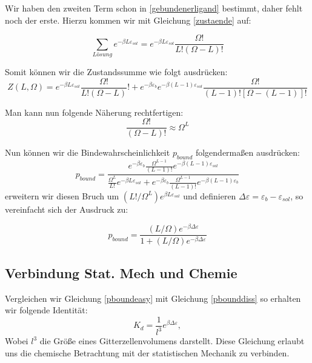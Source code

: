 \documentclass[bachelor,       %
               twoside,        %
               BCOR10mm,       %
               english,ngerman, %
               ]{GAUBM}
\begin{document}
Wir haben den zweiten Term schon in \ref{gebundenerligand} bestimmt, daher fehlt noch der erste.
Hierzu kommen wir mit Gleichung \ref{zustaende} auf:

\begin{equation}
\sum_{Lösung}e^{-\beta L\varepsilon_{sol}} = e^{-\beta L\varepsilon_{sol}}\frac{\Omega!}{L!(\Omega-L)!}
\end{equation}

Somit können wir die Zustandssumme wie folgt ausdrücken:
\begin{equation}
Z(L,\Omega) = e^{-\beta L\varepsilon_{sol}}\frac{\Omega!}{L!(\Omega-L)}! + e^{-\beta\varepsilon_b}e^{-\beta(L-1)\varepsilon_{sol}} \frac{\Omega!}{(L-1)![\Omega-(L-1)]!}
\end{equation}

Man kann nun folgende Näherung rechtfertigen:\cite{phybio}
\begin{equation}
\frac{\Omega!}{(\Omega-L)!} \approx \Omega^L
\end{equation}

Nun können wir die Bindewahrscheinlichkeit $p_{bound}$ folgendermaßen ausdrücken:
\begin{equation}
p_{bound} = \frac{e^{-\beta\varepsilon_b}\frac{\Omega^{L-1}}{(L-1)!}e^{-\beta(L-1)\varepsilon_{sol}}}{\frac{\Omega^L}{L!}e^{-\beta L\varepsilon_{sol}} + e^{-\beta\varepsilon_b}\frac{\Omega^{L-1}}{(L-1)!}e^{-\beta(L-1)\varepsilon_b}}
\end{equation}
erweitern wir diesen Bruch um $(L!/\Omega^L)e^{\beta L\varepsilon_{sol}}$ und definieren
$\Delta\varepsilon = \varepsilon_b -\varepsilon_{sol}$, so vereinfacht sich der Ausdruck zu:

\begin{equation}
\label{pboundeasy}
p_{bound} = \frac{(L/\Omega)e^{-\beta\Delta\varepsilon}}{1+(L/\Omega)e^{-\beta\Delta\varepsilon}}
\end{equation}
\subsection{Verbindung Stat. Mech und Chemie}
Vergleichen wir Gleichung \ref{pboundeasy} mit Gleichung \ref{pbounddiss} so erhalten wir folgende Identität:
\begin{equation}
\label{mechchem}
K_d = \frac{1}{l^3}e^{\beta\Delta\varepsilon},
\end{equation}
Wobei $l^3$ die Größe eines Gitterzellenvolumens darstellt.
Diese Gleichung erlaubt uns die chemische Betrachtung mit der statistischen Mechanik zu verbinden.
\end{document}
